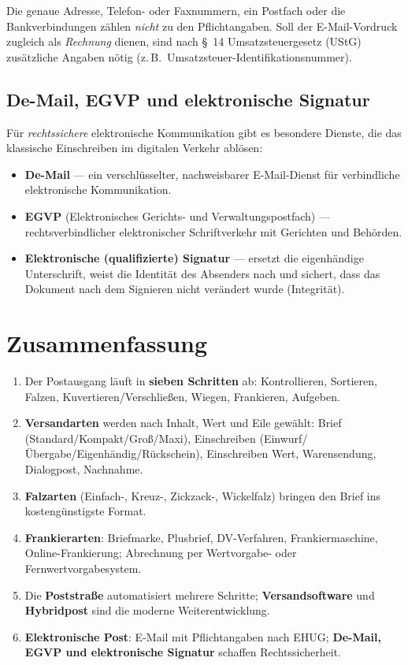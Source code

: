 \documentclass[11pt, a4paper]{article}
\begin{document}
\medskip
Die genaue Adresse, Telefon- oder Faxnummern, ein Postfach oder die Bankverbindungen
zählen \emph{nicht} zu den Pflichtangaben. Soll der E-Mail-Vordruck zugleich als
\emph{Rechnung} dienen, sind nach \S~14 Umsatzsteuergesetz (UStG) zusätzliche Angaben
nötig (z.\,B.\ Umsatzsteuer-Identifikationsnummer).

\subsection{De-Mail, EGVP und elektronische Signatur}

Für \emph{rechtssichere} elektronische Kommunikation gibt es besondere Dienste, die das
klassische Einschreiben im digitalen Verkehr ablösen:

\begin{itemize}
  \item \textbf{De-Mail} --- ein verschlüsselter, nachweisbarer E-Mail-Dienst für verbindliche elektronische Kommunikation.
  \item \textbf{EGVP} (Elektronisches Gerichts- und Verwaltungspostfach) --- rechtsverbindlicher elektronischer Schriftverkehr mit Gerichten und Behörden.
  \item \textbf{Elektronische (qualifizierte) Signatur} --- ersetzt die eigenhändige Unterschrift, weist die Identität des Absenders nach und sichert, dass das Dokument nach dem Signieren nicht verändert wurde (Integrität).
\end{itemize}

\section{Zusammenfassung}

\begin{enumerate}
  \item Der Postausgang läuft in \textbf{sieben Schritten} ab: Kontrollieren, Sortieren, Falzen, Kuvertieren/Verschließen, Wiegen, Frankieren, Aufgeben.
  \item \textbf{Versandarten} werden nach Inhalt, Wert und Eile gewählt: Brief (Standard/Kompakt/Groß/Maxi), Einschreiben (Einwurf/Übergabe/Eigenhändig/Rückschein), Einschreiben Wert, Warensendung, Dialogpost, Nachnahme.
  \item \textbf{Falzarten} (Einfach-, Kreuz-, Zickzack-, Wickelfalz) bringen den Brief ins kostengünstigste Format.
  \item \textbf{Frankierarten}: Briefmarke, Plusbrief, DV-Verfahren, Frankiermaschine, Online-Frankierung; Abrechnung per Wertvorgabe- oder Fernwertvorgabesystem.
  \item Die \textbf{Poststraße} automatisiert mehrere Schritte; \textbf{Versandsoftware} und \textbf{Hybridpost} sind die moderne Weiterentwicklung.
  \item \textbf{Elektronische Post}: E-Mail mit Pflichtangaben nach EHUG; \textbf{De-Mail, EGVP und elektronische Signatur} schaffen Rechtssicherheit.
\end{enumerate}
\end{document}
